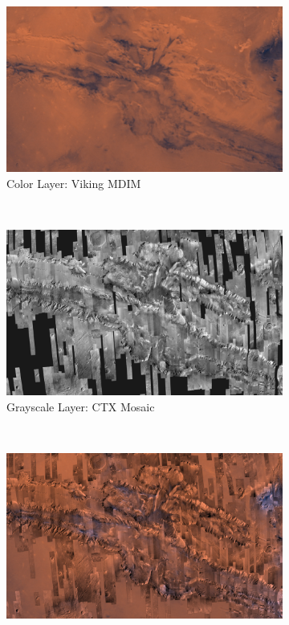 \begin{figure}[h]
    \centering
    \begin{subfigure}[bt]{0.45\textwidth}
        \includegraphics[width=\textwidth]{figures/results/screenshots_thesis_old/valles_marineris1.jpg}
        \caption{Color Layer: Viking MDIM}
    \end{subfigure}
    ~
    \begin{subfigure}[bt]{0.45\textwidth}
        \includegraphics[width=\textwidth]{figures/results/screenshots_thesis_old/valles_marineris2.jpg}
        \caption{Grayscale Layer: CTX Mosaic}
    \end{subfigure}
    ~
    \begin{subfigure}[bt]{0.90\textwidth}
        \includegraphics[width=\textwidth]{figures/results/screenshots_thesis_old/valles_marineris3.jpg}

\end{subfigure}
\end{figure}
